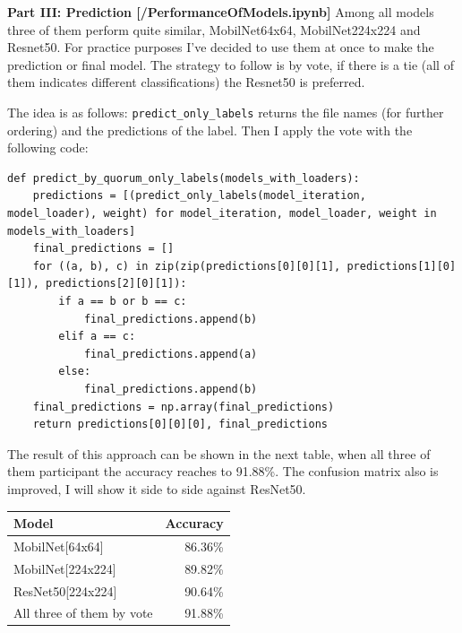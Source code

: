 \documentclass{cpsc202}
\begin{document}
    \large\textbf{Part III: Prediction [/PerformanceOfModels.ipynb]}
    Among all models three of them perform quite similar, MobilNet64x64, MobilNet224x224 and Resnet50.
    For practice purposes I've decided to use them at once to make the prediction or final model.
    The strategy to follow is by vote, if there is a tie (all of them indicates different classifications) the Resnet50 is preferred.

    The idea is as follows: \lstinline|predict_only_labels| returns the file names (for further ordering) and the predictions of the label.
    Then I apply the vote with the following code:
    \begin{lstlisting}
def predict_by_quorum_only_labels(models_with_loaders):
    predictions = [(predict_only_labels(model_iteration, model_loader), weight) for model_iteration, model_loader, weight in models_with_loaders]
    final_predictions = []
    for ((a, b), c) in zip(zip(predictions[0][0][1], predictions[1][0][1]), predictions[2][0][1]):
        if a == b or b == c:
            final_predictions.append(b)
        elif a == c:
            final_predictions.append(a)
        else:
            final_predictions.append(b)
    final_predictions = np.array(final_predictions)
    return predictions[0][0][0], final_predictions

    \end{lstlisting}

    The result of this approach can be shown in the next table, when all three of them participant the accuracy reaches to 91.88\%.
    The confusion matrix also is improved, I will show it side to side against ResNet50. \\

    \begin{center}

\begin{tabular}{||l | r||}
 \hline
 Model & Accuracy \\ [0.5ex]
 \hline\hline
 MobilNet[64x64] & 86.36\% \\ \hline
 MobilNet[224x224] & 89.82\% \\ \hline
 ResNet50[224x224] & 90.64\% \\
 \hline \hline
 All three of them by vote & 91.88\% \\ [1ex]
 \hline
\end{tabular}
\end{center}
\end{document}
